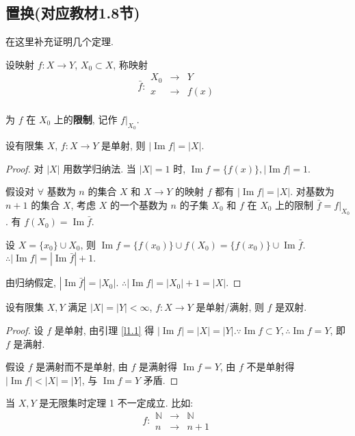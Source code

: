 \documentclass{ctexart}
\begin{document}
\subsection{置换(对应教材1.8节)}
在这里补充证明几个定理.
\begin{definition}
    设映射 $f:X\to Y$, $X_0\subset X$, 称映射
    \[\bar{f}:\begin{array}{rcl}
        X_0 & \to & Y \\
        x & \to & f(x) \\
    \end{array}\]

    为 $f$ 在 $X_0$ 上的\textbf{限制}, 记作 $f|_{X_0}$.
\end{definition}
\begin{lemma}\label{l1.1}
    设有限集 $X$, $f:X\to Y$ 是单射, 则 $|\operatorname{Im}f|=|X|$.
\end{lemma}
\begin{proof}
    对 $|X|$ 用数学归纳法. 当 $|X|=1$ 时, $\operatorname{Im}f=\{f(x)\},|\operatorname{Im}f|=1$.

    假设对 $\forall$ 基数为 $n$ 的集合 $X$ 和 $X\to Y$ 的映射 $f$ 都有 $|\operatorname{Im}f|=|X|$. 对基数为 $n+1$ 的集合 $X$, 考虑 $X$ 的一个基数为 $n$ 的子集 $X_0$ 和 $f$ 在 $X_0$ 上的限制 $\bar{f}=f|_{X_0}$. 有 $f(X_0)=\operatorname{Im}\bar{f}$.

    设 $X=\{x_0\}\cup X_0$, 则 $\operatorname{Im}f=\{f(x_0)\}\cup f(X_0)=\{f(x_0)\}\cup\operatorname{Im}\bar{f}$. $\therefore|\operatorname{Im}f|=|\operatorname{Im}\bar{f}|+1$.

    由归纳假定, $|\operatorname{Im}\bar{f}|=|X_0|$. $\therefore|\operatorname{Im}f|=|X_0|+1=|X|$.
\end{proof}
\begin{theorem}
    设有限集 $X,Y$ 满足 $|X|=|Y|<\infty$, $f:X\to Y$ 是单射/满射, 则 $f$ 是双射.
\end{theorem}
\begin{proof}
    设 $f$ 是单射, 由引理 \ref{l1.1} 得 $|\operatorname{Im}f|=|X|=|Y|.\because\operatorname{Im}f\subset Y,\therefore\operatorname{Im}f=Y$, 即 $f$ 是满射.

    假设 $f$ 是满射而不是单射, 由 $f$ 是满射得 $\operatorname{Im}f=Y$, 由 $f$ 不是单射得 $|\operatorname{Im}f|<|X|=|Y|$, 与 $\operatorname{Im}f=Y$ 矛盾.
\end{proof}

当 $X,Y$ 是无限集时定理 1 不一定成立. 比如:
\[f:\begin{array}{rcl}
\mathbb{N} & \to & \mathbb{N} \\
n & \to & n+1
\end{array}\]
\end{document}

